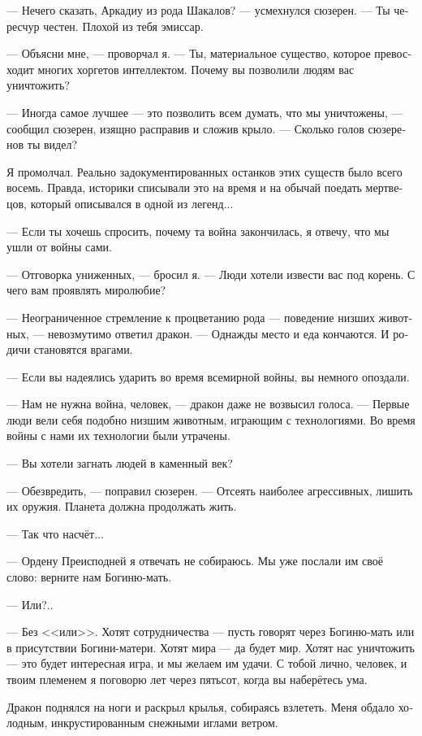 \documentclass[a4paper,12pt,fleqn]{book}\usepackage{cooltooltips}\usepackage{polyglossia}\setdefaultlanguage[babelshorthands=true]{russian}\setotherlanguage{english}\defaultfontfeatures{Ligatures=TeX,Mapping=tex-text} \usepackage{xcolor}\definecolor{lightgray}{HTML}{bbbbbb}\color{lightgray}\newcommand{\ml}[3]{\textenglish{\textcolor{black}{#3}}}
\begin{document}
--- Нечего сказать, Аркадиу из рода Шакалов? --- усмехнулся сюзерен.
--- Ты чересчур честен.
Плохой из тебя эмиссар.

--- Объясни мне, --- проворчал я.
--- Ты, материальное существо, которое превосходит многих хоргетов интеллектом.
Почему вы позволили людям вас уничтожить?

--- Иногда самое лучшее --- это позволить всем думать, что мы уничтожены, --- сообщил сюзерен, изящно расправив и сложив крыло.
--- Сколько голов сюзеренов ты видел?

Я промолчал.
Реально задокументированных останков этих существ было всего восемь.
Правда, историки списывали это на время и на обычай поедать мертвецов, который описывался в одной из легенд...

--- Если ты хочешь спросить, почему та война закончилась, я отвечу, что мы ушли от войны сами.

--- Отговорка униженных, --- бросил я.
--- Люди хотели извести вас под корень.
С чего вам проявлять миролюбие?

--- Неограниченное стремление к процветанию рода --- поведение низших животных, --- невозмутимо ответил дракон.
--- Однажды место и еда кончаются.
И родичи становятся врагами.

--- Если вы надеялись ударить во время всемирной войны, вы немного опоздали.

--- Нам не нужна война, человек, --- дракон даже не возвысил голоса.
--- Первые люди вели себя подобно низшим животным, играющим с технологиями.
Во время войны с нами их технологии были утрачены.

--- Вы хотели загнать людей в каменный век?

--- Обезвредить, --- поправил сюзерен.
--- Отсеять наиболее агрессивных, лишить их оружия.
Планета должна продолжать жить.

--- Так что насчёт...

--- Ордену Преисподней я отвечать не собираюсь.
Мы уже послали им своё слово: верните нам Богиню-мать.

--- Или?..

--- Без <<или>>.
Хотят сотрудничества --- пусть говорят через Богиню-мать или в присутствии Богини-матери.
Хотят мира --- да будет мир.
Хотят нас уничтожить --- это будет интересная игра, и мы желаем им удачи.
С тобой лично, человек, и твоим племенем я поговорю лет через пятьсот, когда вы наберётесь ума.

Дракон поднялся на ноги и раскрыл крылья, собираясь взлететь.
Меня обдало холодным, инкрустированным снежными иглами ветром.
\end{document}

